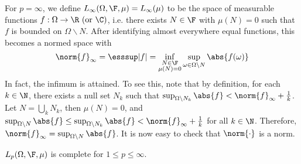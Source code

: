 \documentclass[a4paper]{article}
\begin{document}
For $p=\infty$, we define $L_\infty(\Omega,\F,\mu)=L_\infty(\mu)$ to be the space of  measurable functions $f:\Omega\to\R\ (\text{or }\C)$, i.e. there exists $N\in\F$ with $\mu(N)=0$ such that $f$ is bounded on $\Omega\backslash N$. After identifying almost everywhere equal functions, this becomes a normed space with
\[
  \norm{f}_\infty=\esssup|f|=\inf_{\substack{N\in\F \\ \mu(N)=0}}\sup_{\omega\in\Omega\backslash N}\abs{f(\omega)}
\]
In fact, the infimum is attained. To see this, note that by definition, for each $k\in\N$, there exists a null set $N_k$ such that $\sup_{\Omega\backslash N_k}\abs{f}<\norm{f}_\infty+\frac{1}{k}$. Let $N=\bigcup_k N_k$, then $\mu(N)=0$, and $\sup_{\Omega\backslash N}\abs{f}\leq\sup_{\Omega\backslash N_k}\abs{f}<\norm{f}_\infty+\frac{1}{k}$ for all $k\in\N$. Therefore, $\norm{f}_\infty=\sup_{\Omega\backslash N}\abs{f}$. It is now easy to check that $\norm{\cdot}$ is a norm.

\begin{nthm}\label{thm:LpComplete}
  $L_p(\Omega,\F,\mu)$ is complete for $1\leq p\leq\infty$.
\end{nthm}
\end{document}

